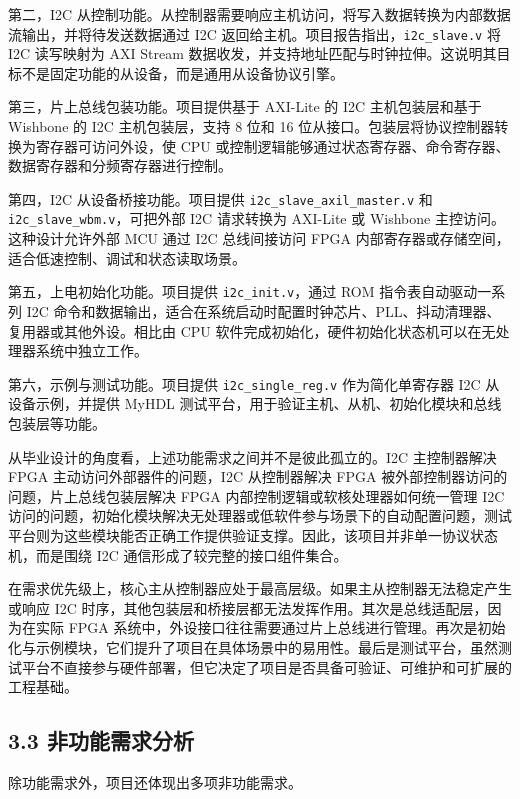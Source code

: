 第二，I2C 从控制功能。从控制器需要响应主机访问，将写入数据转换为内部数据流输出，并将待发送数据通过 I2C 返回给主机。项目报告指出，\texttt{i2c\_slave.v} 将 I2C 读写映射为 AXI Stream 数据收发，并支持地址匹配与时钟拉伸。这说明其目标不是固定功能的从设备，而是通用从设备协议引擎。

第三，片上总线包装功能。项目提供基于 AXI-Lite 的 I2C 主机包装层和基于 Wishbone 的 I2C 主机包装层，支持 8 位和 16 位从接口。包装层将协议控制器转换为寄存器可访问外设，使 CPU 或控制逻辑能够通过状态寄存器、命令寄存器、数据寄存器和分频寄存器进行控制。

第四，I2C 从设备桥接功能。项目提供 \texttt{i2c\_slave\_axil\_master.v} 和 \texttt{i2c\_slave\_wbm.v}，可把外部 I2C 请求转换为 AXI-Lite 或 Wishbone 主控访问。这种设计允许外部 MCU 通过 I2C 总线间接访问 FPGA 内部寄存器或存储空间，适合低速控制、调试和状态读取场景。

第五，上电初始化功能。项目提供 \texttt{i2c\_init.v}，通过 ROM 指令表自动驱动一系列 I2C 命令和数据输出，适合在系统启动时配置时钟芯片、PLL、抖动清理器、复用器或其他外设。相比由 CPU 软件完成初始化，硬件初始化状态机可以在无处理器系统中独立工作。

第六，示例与测试功能。项目提供 \texttt{i2c\_single\_reg.v} 作为简化单寄存器 I2C 从设备示例，并提供 MyHDL 测试平台，用于验证主机、从机、初始化模块和总线包装层等功能。

从毕业设计的角度看，上述功能需求之间并不是彼此孤立的。I2C 主控制器解决 FPGA 主动访问外部器件的问题，I2C 从控制器解决 FPGA 被外部控制器访问的问题，片上总线包装层解决 FPGA 内部控制逻辑或软核处理器如何统一管理 I2C 访问的问题，初始化模块解决无处理器或低软件参与场景下的自动配置问题，测试平台则为这些模块能否正确工作提供验证支撑。因此，该项目并非单一协议状态机，而是围绕 I2C 通信形成了较完整的接口组件集合。

在需求优先级上，核心主从控制器应处于最高层级。如果主从控制器无法稳定产生或响应 I2C 时序，其他包装层和桥接层都无法发挥作用。其次是总线适配层，因为在实际 FPGA 系统中，外设接口往往需要通过片上总线进行管理。再次是初始化与示例模块，它们提升了项目在具体场景中的易用性。最后是测试平台，虽然测试平台不直接参与硬件部署，但它决定了项目是否具备可验证、可维护和可扩展的工程基础。

\subsection{3.3 非功能需求分析}\label{ux975eux529fux80fdux9700ux6c42ux5206ux6790}

除功能需求外，项目还体现出多项非功能需求。

